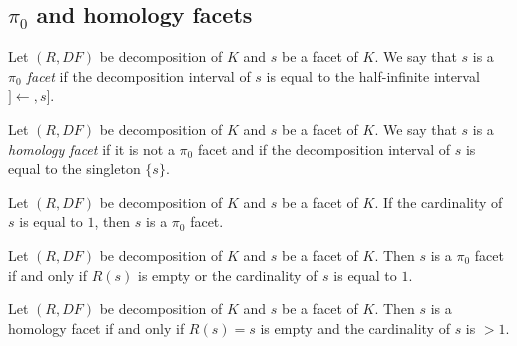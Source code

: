 \subsection{$\pi_0$ and homology facets}

\begin{subdefi}
Let $(R,DF)$ be decomposition of $K$ and $s$ be a facet of $K$. We say that $s$ is a \emph{$\pi_0$ facet} if the decomposition
interval of $s$ is equal to the half-infinite interval $]\leftarrow,s]$.

\end{subdefi}

\begin{subdefi}[IsHomologyFacet]
Let $(R,DF)$ be decomposition of $K$ and $s$ be a facet of $K$. We say that $s$ is a \emph{homology facet} if it is not a $\pi_0$ facet
and if the decomposition interval of $s$ is equal to the singleton $\{s\}$.

\end{subdefi}

\begin{sublemma}
Let $(R,DF)$ be decomposition of $K$ and $s$ be a facet of $K$. If the cardinality of $s$ is equal to $1$, then $s$ is a $\pi_0$ facet.

\end{sublemma}

\begin{sublemma}
Let $(R,DF)$ be decomposition of $K$ and $s$ be a facet of $K$. Then $s$ is a $\pi_0$ facet if and only if $R(s)$ is empty or the
cardinality of $s$ is equal to $1$.

\end{sublemma}

\begin{sublemma}
Let $(R,DF)$ be decomposition of $K$ and $s$ be a facet of $K$. Then $s$ is a homology facet if and only if $R(s)=s$ is empty and the
cardinality of $s$ is $>1$.

\end{sublemma}










